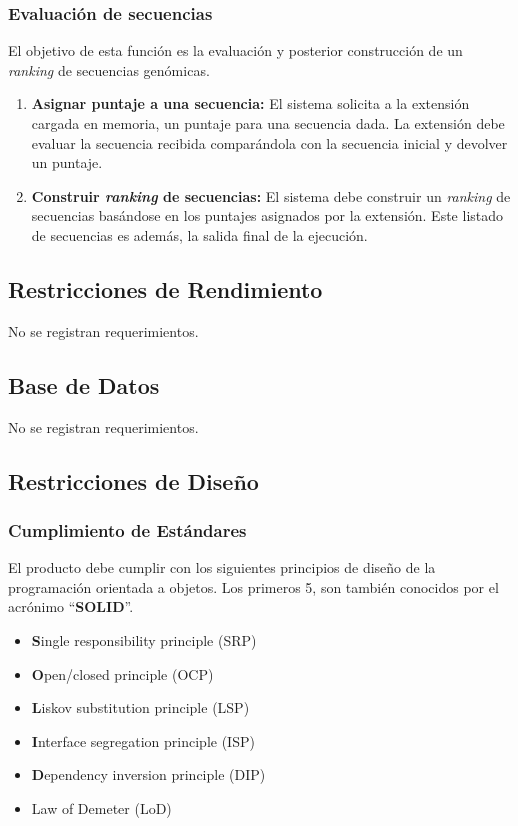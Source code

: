 \documentclass[10pt,a4paper]{article}
\begin{document}
  \subsubsection{Evaluaci\'on de secuencias}
  El objetivo de esta funci\'on es la evaluaci\'on y posterior construcci\'on de un \textit{ranking} de secuencias gen\'omicas.
  \begin{enumerate}    
    \item \textbf{Asignar puntaje a una secuencia:}
    El sistema solicita a la extensi\'on cargada en memoria, un puntaje para una secuencia dada. La extensi\'on debe evaluar la secuencia recibida compar\'andola con la secuencia inicial y devolver un puntaje.
    
    \item \textbf{Construir \textit{ranking} de secuencias:}
    El sistema debe construir un \textit{ranking} de secuencias bas\'andose en los puntajes asignados por la extensi\'on. Este listado de secuencias es adem\'as, la salida final de la ejecuci\'on.
  \end{enumerate}

  \subsection{Restricciones de Rendimiento}
  No se registran requerimientos.

  \subsection{Base de Datos}
  No se registran requerimientos.

  \subsection{Restricciones de Dise\~no}
    \subsubsection{Cumplimiento de Est\'andares}
    El producto debe cumplir con los siguientes principios de dise\~no de la programaci\'on orientada a objetos. Los primeros 5, son tambi\'en conocidos por el acr\'onimo ``\textbf{SOLID}''.
    \begin{itemize}
      \item \textbf{S}ingle responsibility principle (SRP)
      \item \textbf{O}pen/closed principle (OCP)
      \item \textbf{L}iskov substitution principle (LSP)
      \item \textbf{I}nterface segregation principle (ISP)
      \item \textbf{D}ependency inversion principle (DIP)   
      \item Law of Demeter (LoD)
    \end{itemize}
\end{document}
